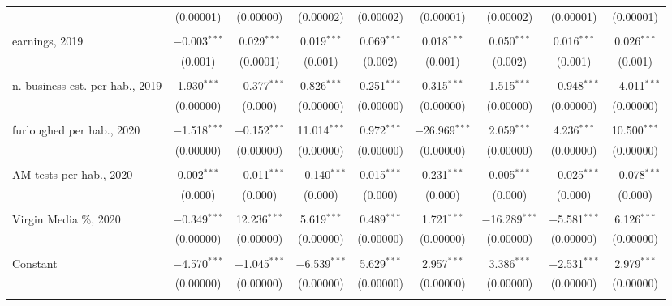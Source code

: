 \begin{sidewaystable}[!htbp]
\begin{tabular}{@{\extracolsep{5pt}}lcccccccc}
  & (0.00001) & (0.00000) & (0.00002) & (0.00002) & (0.00001) & (0.00002) & (0.00001) & (0.00001) \\ 
  & & & & & & & & \\ 
 earnings, 2019 & $-$0.003$^{***}$ & 0.029$^{***}$ & 0.019$^{***}$ & 0.069$^{***}$ & 0.018$^{***}$ & 0.050$^{***}$ & 0.016$^{***}$ & 0.026$^{***}$ \\ 
  & (0.001) & (0.0001) & (0.001) & (0.002) & (0.001) & (0.002) & (0.001) & (0.001) \\ 
  & & & & & & & & \\ 
 n. business est. per hab., 2019 & 1.930$^{***}$ & $-$0.377$^{***}$ & 0.826$^{***}$ & 0.251$^{***}$ & 0.315$^{***}$ & 1.515$^{***}$ & $-$0.948$^{***}$ & $-$4.011$^{***}$ \\ 
  & (0.00000) & (0.000) & (0.00000) & (0.00000) & (0.00000) & (0.00000) & (0.00000) & (0.00000) \\ 
  & & & & & & & & \\ 
 furloughed per hab., 2020 & $-$1.518$^{***}$ & $-$0.152$^{***}$ & 11.014$^{***}$ & 0.972$^{***}$ & $-$26.969$^{***}$ & 2.059$^{***}$ & 4.236$^{***}$ & 10.500$^{***}$ \\ 
  & (0.00000) & (0.00000) & (0.00000) & (0.00000) & (0.00000) & (0.00000) & (0.00000) & (0.00000) \\ 
  & & & & & & & & \\ 
 AM tests per hab., 2020 & 0.002$^{***}$ & $-$0.011$^{***}$ & $-$0.140$^{***}$ & 0.015$^{***}$ & 0.231$^{***}$ & 0.005$^{***}$ & $-$0.025$^{***}$ & $-$0.078$^{***}$ \\ 
  & (0.000) & (0.000) & (0.000) & (0.000) & (0.000) & (0.000) & (0.000) & (0.000) \\ 
  & & & & & & & & \\ 
 Virgin Media \%, 2020 & $-$0.349$^{***}$ & 12.236$^{***}$ & 5.619$^{***}$ & 0.489$^{***}$ & 1.721$^{***}$ & $-$16.289$^{***}$ & $-$5.581$^{***}$ & 6.126$^{***}$ \\ 
  & (0.00000) & (0.00000) & (0.00000) & (0.00000) & (0.00000) & (0.00000) & (0.00000) & (0.00000) \\ 
  & & & & & & & & \\ 
 Constant & $-$4.570$^{***}$ & $-$1.045$^{***}$ & $-$6.539$^{***}$ & 5.629$^{***}$ & 2.957$^{***}$ & 3.386$^{***}$ & $-$2.531$^{***}$ & 2.979$^{***}$ \\ 
  & (0.00000) & (0.00000) & (0.00000) & (0.00000) & (0.00000) & (0.00000) & (0.00000) & (0.00000) \\ 
  & & & & & & & & \\ 

\end{tabular}
\end{sidewaystable}
